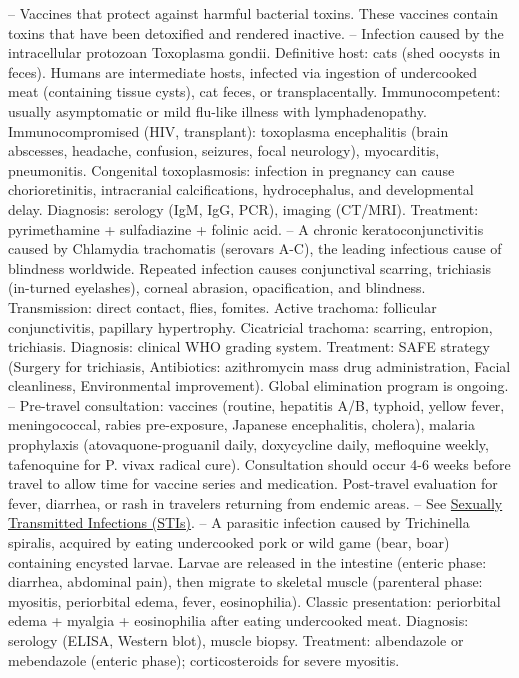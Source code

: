 -- Vaccines that protect against harmful bacterial toxins. These vaccines contain toxins that have been detoxified and rendered inactive.
-- Infection caused by the intracellular protozoan Toxoplasma gondii. Definitive host: cats (shed oocysts in feces). Humans are intermediate hosts, infected via ingestion of undercooked meat (containing tissue cysts), cat feces, or transplacentally. Immunocompetent: usually asymptomatic or mild flu-like illness with lymphadenopathy. Immunocompromised (HIV, transplant): toxoplasma encephalitis (brain abscesses, headache, confusion, seizures, focal neurology), myocarditis, pneumonitis. Congenital toxoplasmosis: infection in pregnancy can cause chorioretinitis, intracranial calcifications, hydrocephalus, and developmental delay. Diagnosis: serology (IgM, IgG, PCR), imaging (CT/MRI). Treatment: pyrimethamine + sulfadiazine + folinic acid.
-- A chronic keratoconjunctivitis caused by Chlamydia trachomatis (serovars A-C), the leading infectious cause of blindness worldwide. Repeated infection causes conjunctival scarring, trichiasis (in-turned eyelashes), corneal abrasion, opacification, and blindness. Transmission: direct contact, flies, fomites. Active trachoma: follicular conjunctivitis, papillary hypertrophy. Cicatricial trachoma: scarring, entropion, trichiasis. Diagnosis: clinical WHO grading system. Treatment: SAFE strategy (Surgery for trichiasis, Antibiotics: azithromycin mass drug administration, Facial cleanliness, Environmental improvement). Global elimination program is ongoing.
-- Pre-travel consultation: vaccines (routine, hepatitis A/B, typhoid, yellow fever, meningococcal, rabies pre-exposure, Japanese encephalitis, cholera), malaria prophylaxis (atovaquone-proguanil daily, doxycycline daily, mefloquine weekly, tafenoquine for P. vivax radical cure). Consultation should occur 4-6 weeks before travel to allow time for vaccine series and medication. Post-travel evaluation for fever, diarrhea, or rash in travelers returning from endemic areas.
-- See \hyperlink{Sexually Transmitted Infections (STIs)}{Sexually Transmitted Infections (STIs)}.
-- A parasitic infection caused by Trichinella spiralis, acquired by eating undercooked pork or wild game (bear, boar) containing encysted larvae. Larvae are released in the intestine (enteric phase: diarrhea, abdominal pain), then migrate to skeletal muscle (parenteral phase: myositis, periorbital edema, fever, eosinophilia). Classic presentation: periorbital edema + myalgia + eosinophilia after eating undercooked meat. Diagnosis: serology (ELISA, Western blot), muscle biopsy. Treatment: albendazole or mebendazole (enteric phase); corticosteroids for severe myositis.

